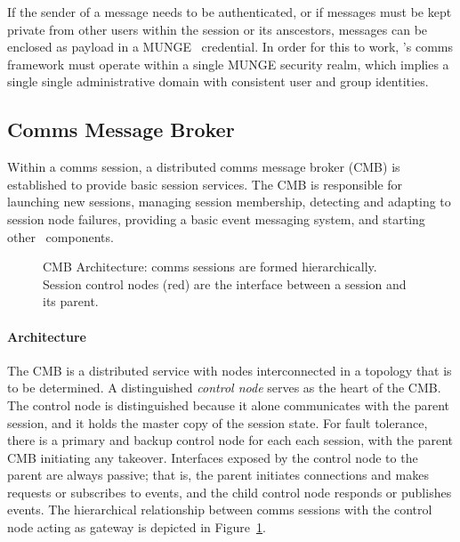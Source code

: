If the sender of a message needs to be authenticated, or if messages must
be kept private from other users within the session or its anscestors,
messages can be enclosed as payload in a MUNGE~\cite{MUNGE}
credential.
In order for this to work, \ngrm's comms framework must operate within a
single MUNGE security realm,
which implies a single single administrative domain with consistent
user and group identities.

\subsection{Comms Message Broker}\label{SecCommsCMB}

Within a comms session, a distributed comms message broker (CMB)
is established to provide basic session services.
The CMB is responsible for launching new sessions,
managing session membership,
detecting and adapting to session node failures,
providing a basic event messaging system,
and starting other \ngrm\ components.

\begin{figure}
\begin{minipage}[b]{0.2\linewidth}
\end{minipage}
\hspace{0.5cm}
\begin{minipage}[b]{0.2\linewidth}
\end{minipage}
\hspace{0.5cm}
\begin{minipage}[b]{0.2\linewidth}
\end{minipage}
\hspace{0.5cm}
\begin{minipage}[b]{0.2\linewidth}
\end{minipage}
\caption{CMB Architecture:  comms sessions are formed hierarchically.
Session control nodes (red) are the interface between a session and its parent.}
\label{FigCommsEx1}
\end{figure}

\paragraph{Architecture}
The CMB is a distributed service with nodes interconnected in a topology
that is to be determined.
A distinguished {\em control node} serves as the heart of the CMB.
The control node is distinguished because it alone communicates with
the parent session, and it holds the master copy of the session state.
For fault tolerance, there is a primary and backup control node for each
each session, with the parent CMB initiating any takeover.
Interfaces exposed by the control node to the parent are always passive;
that is, the parent initiates connections and makes requests or subscribes
to events, and the child control node responds or publishes events.
The hierarchical relationship between comms sessions with the control
node acting as gateway is depicted in Figure~\ref{FigCommsEx1}.

